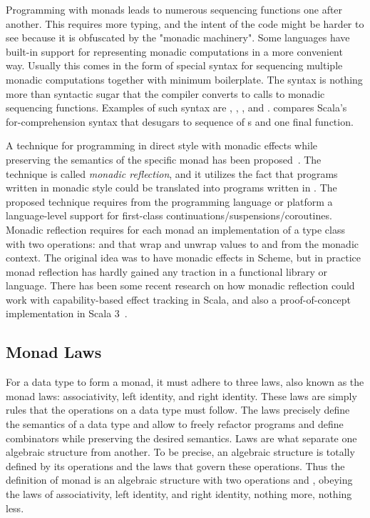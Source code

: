 

Programming with monads leads to numerous sequencing functions one after another. This requires more typing, and the intent of the code might be harder to see because it is obfuscated by the "monadic machinery". Some languages have built-in support for representing monadic computations in a more convenient way. Usually this comes in the form of special syntax for sequencing multiple monadic computations together with minimum boilerplate. The syntax is nothing more than syntactic sugar that the compiler converts to calls to monadic sequencing functions. Examples of such syntax are \textcite{haskell-do-notation}, \textcite{scala-for-comprehension}, \textcite{fsharp-computation-expression}, and \textcite{ocaml-bind-ops}.  compares Scala's for-comprehension syntax that desugars to sequence of s and one final  function.



A technique for programming in direct style with monadic effects while preserving the semantics of the specific monad has been proposed~\cite{representing-monads}. The technique is called \textit{monadic reflection}, and it utilizes the fact that programs written in monadic style could be translated into programs written in . The proposed technique requires from the programming language or platform a language-level support for first-class continuations/suspensions/coroutines. Monadic reflection requires for each monad an implementation of a type class with two operations:  and  that wrap and unwrap values to and from the monadic context. The original idea was to have monadic effects in Scheme, but in practice monad reflection has hardly gained any traction in a functional library or language. There has been some recent research on how monadic reflection could work with capability-based effect tracking in Scala, and also a proof-of-concept implementation in Scala 3~\cite{representing-monads-capabilities, monadic-reflection-scala}.


\subsection{Monad Laws} \label{monad:laws}
For a data type to form a monad, it must adhere to three laws, also known as the monad laws: associativity, left identity, and right identity. These laws are simply rules that the operations on a data type must follow. The laws precisely define the semantics of a data type and allow to freely refactor programs and define combinators while preserving the desired semantics. Laws are what separate one algebraic structure from another. To be precise, an algebraic structure is totally defined by its operations and the laws that govern these operations. Thus the definition of monad is an algebraic structure with two operations
 and , obeying the laws of associativity, left identity, and right identity, nothing more, nothing less.~\cite{fp-in-scala}

